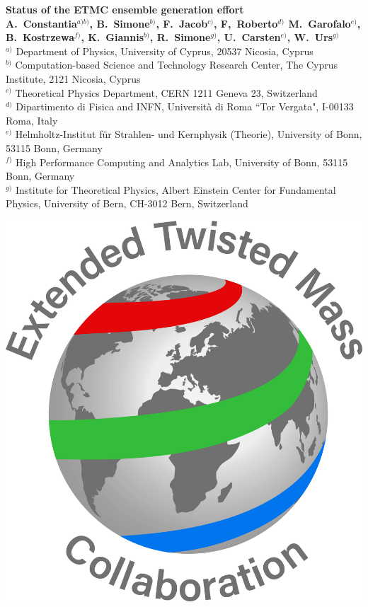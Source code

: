 \documentclass[a0,portrait]{a0poster}
\begin{document}
\begin{minipage}[b]{0.74\linewidth}
    \VeryHuge \color{NavyBlue} \textbf{Status of the ETMC ensemble generation effort} \color{Black}\\[1.4cm] %
    \Large \textbf{A.~Constantia$^{a)b)}$, B.~Simone$^{b)}$, F.~Jacob$^{c)}$, F,~Roberto$^{d)}$ M.~Garofalo$^{e)}$, B.~Kostrzewa$^{f)}$, K.~Giannis$^{b)}$, R.~Simone$^{g)}$, U.~Carsten$^{e)}$, W.~Urs$^{g)}$}\\[0.5cm] %
    \large $^{a)}$ Department of Physics, University of Cyprus, 20537 Nicosia, Cyprus\\
    \large $^{b)}$ Computation-based Science and Technology Research Center, The Cyprus Institute, 2121 Nicosia, Cyprus\\
    \large $^{c)}$ Theoretical Physics Department, CERN 1211 Geneva 23, Switzerland\\
    \large $^{d)}$ Dipartimento di Fisica and INFN, Universit\`a di Roma ``Tor Vergata", I-00133 Roma, Italy\\
    \large $^{e)}$ Helmholtz-Institut f{\"u}r Strahlen- und Kernphysik (Theorie), University of Bonn, 53115 Bonn, Germany\\
    \large $^{f)}$ High Performance Computing and Analytics Lab, University of Bonn, 53115 Bonn, Germany\\
    \large $^{g)}$  Institute for Theoretical Physics, Albert Einstein Center for Fundamental Physics, University of Bern, CH-3012 Bern, Switzerland\\
\end{minipage}
%
\begin{minipage}[b]{0.26\linewidth}
    \includegraphics[width=14cm]{figures/Logo_ETMC_RGB.pdf}
\end{minipage}
\end{document}
